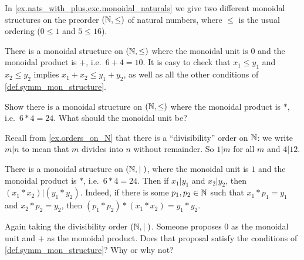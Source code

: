 \documentclass[7Sketches]{subfiles}
\begin{document}
In \cref{ex.nats_with_plus,exc.monoidal_naturals} we give two different monoidal structures on the preorder $(\mathbb{N},\leq)$ of natural numbers, where $\leq$ is the usual ordering ($0\leq 1$ and $5\leq 16$). 

\begin{example}%
\label{ex.nats_with_plus}%
There is a monoidal structure on $(\mathbb{N},\leq)$ where the monoidal unit is $0$ and the monoidal product is $+$, i.e.\ $6+4=10$. It is easy to check that $x_1\leq y_1$ and $x_2\leq y_2$ implies $x_1+x_2\leq y_1+y_2$, as well as all the other conditions of \cref{def.symm_mon_structure}.
\end{example}

\begin{exercise} %
\label{exc.monoidal_naturals}
Show there is a monoidal structure on $(\mathbb{N},\leq)$ where the monoidal product is $*$, i.e.\ $6*4=24$. What should the monoidal unit be?
\end{exercise}

\begin{example}
Recall from \cref{ex.orders_on_N} that there is a ``divisibility'' order on $\mathbb{N}$: we write $m|n$ to mean that $m$ divides into $n$ without remainder. So $1\vert m$ for all $m$ and $4\vert 12$.

There is a monoidal structure on $(\mathbb{N},\vert\;)$, where the monoidal unit is $1$ and the monoidal product is $*$, i.e.\ $6*4=24$. Then if $x_1\vert y_1$ and $x_2\vert y_2$, then $(x_1*x_2)\vert (y_1*y_2)$. Indeed, if there is some $p_1,p_2\in\mathbb{N}$ such that $x_1*p_1=y_1$ and $x_2*p_2=y_2$, then $(p_1*p_2)*(x_1*x_2)=y_1*y_2$.
\end{example}

\begin{exercise} %
\label{exc.monoidal_naturals2}
Again taking the divisibility order $(\mathbb{N},\vert\;)$. Someone proposes $0$ as the monoidal unit and $+$ as the monoidal product. Does that proposal satisfy the conditions of \cref{def.symm_mon_structure}? Why or why not?
\end{exercise}
\end{document}

